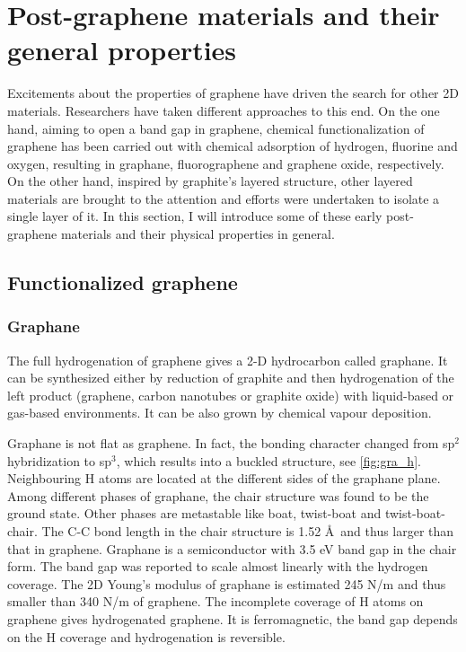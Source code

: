 \section{Post-graphene materials and their general properties}

Excitements about the properties of graphene have driven the search for other 2D materials. Researchers have taken different approaches to this end. On the one hand, aiming to open a band gap in graphene, chemical functionalization of graphene has been carried out with chemical adsorption of hydrogen, fluorine and oxygen, resulting in graphane, fluorographene and graphene oxide, respectively. On the other hand, inspired by graphite's layered structure, other layered materials are brought to the attention and efforts were undertaken to isolate a single layer of it. In this section, I will introduce some of these early post-graphene materials and their physical properties in general.

\subsection{Functionalized graphene}

\subsubsection{Graphane}

The full hydrogenation of graphene gives a 2-D hydrocarbon called graphane. It can be synthesized either by reduction of graphite and then hydrogenation of the left product (graphene, carbon nanotubes or graphite oxide) with liquid-based\cite{Yang2012} or gas-based\cite{Burgess2011} environments. It can be also grown by chemical vapour deposition\cite{wang2010}. 

Graphane is not flat as graphene. In fact, the bonding character changed from sp$^2$ hybridization to sp$^3$, which results into a buckled structure, see \autoref{fig:gra_h}. Neighbouring H atoms are located at the different sides of the graphane plane. Among different phases of graphane, the chair structure was found to be the ground state. Other phases are metastable like boat, twist-boat and twist-boat-chair\cite{Samarakoon2009}. The C-C bond length in the chair structure is 1.52 \AA~and thus larger than that in graphene. Graphane is a semiconductor with 3.5 eV band gap in the chair form. The band gap was reported to scale almost linearly with the hydrogen coverage\cite{Ilyin2011}. The 2D Young's modulus of graphane is estimated 245 \si{N/m}\cite{Munoz2010} and thus smaller than 340 \si{N/m} of graphene. The incomplete coverage of H atoms on graphene gives hydrogenated graphene. It is ferromagnetic\cite{Zhou2009}, the band gap depends on the H coverage\cite{Shkrebtii2011} and hydrogenation is reversible\cite{Elias2009}. 

